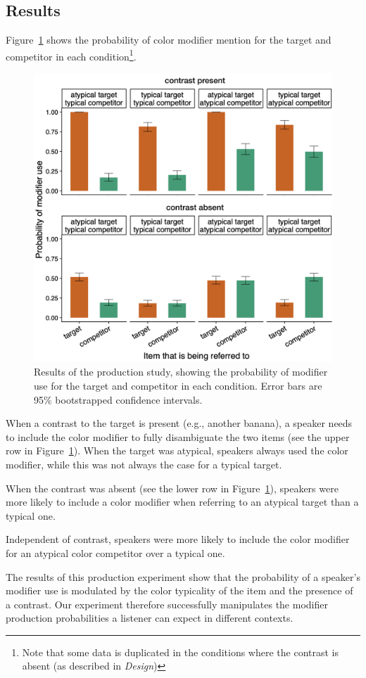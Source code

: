 \documentclass[10pt,letterpaper]{article}
\newcommand{\ek}[1]{\textcolor{Orange}{[ek: #1]}}
\begin{document}
\subsection{Results}
Figure~\ref{prod-results} shows the probability of color modifier mention for the target and competitor in each condition\footnote{Note that some data is duplicated in the conditions where the contrast is absent (as described in \textit{Design})}. 

\begin{figure}
	\begin{center}
		\includegraphics[width=.45\textwidth]{graphs/prod-bycond-paper.pdf}
	\end{center}
\caption{Results of the production study, showing the probability of modifier use for the target and competitor in each condition. Error bars are 95\% bootstrapped confidence intervals.} 
\label{prod-results}
\end{figure}

When a contrast to the target is present (e.g., another banana), a speaker needs to include the color modifier to fully disambiguate the two items (see the upper row in Figure~\ref{prod-results}). When the target was atypical, speakers always used the color modifier, while this was not always the case for a typical target.

When the contrast was absent (see the lower row in Figure~\ref{prod-results}), speakers were more likely to include a color modifier when referring to an atypical target than a typical one.

Independent of contrast, speakers were more likely to include the color modifier for an atypical color competitor over a typical one.

The results of this production experiment show that the probability of a speaker's modifier use is modulated by the color typicality of the item and the presence of a contrast. Our experiment therefore successfully manipulates the modifier production probabilities a listener can expect in different contexts.
\end{document}
